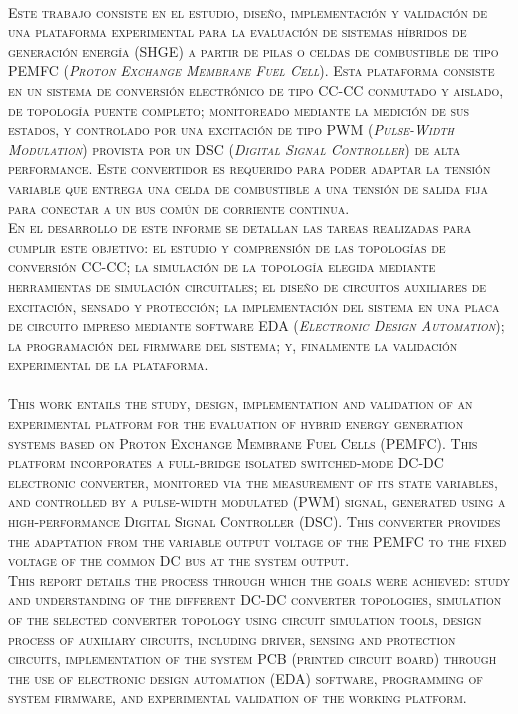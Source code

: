 \huge
\scshape\color{AzulFI_dark}
\\

\normalfont\normalsize\normalcolor
Este trabajo consiste en el estudio, diseño, implementación y validación de una plataforma experimental para la evaluación de sistemas híbridos de generación energía (SHGE) a partir de pilas o celdas de combustible de tipo PEMFC (\textit{Proton Exchange Membrane Fuel Cell}). Esta plataforma consiste en un sistema de conversión electrónico de tipo CC-CC conmutado y aislado, de topología puente completo; monitoreado mediante la medición de sus estados, y controlado por una excitación de tipo PWM (\textit{Pulse-Width Modulation}) provista por un DSC (\textit{Digital Signal Controller}) de alta performance. Este convertidor es requerido para poder adaptar la tensión variable que entrega una celda de combustible a una tensión de salida fija para conectar a un bus común de corriente continua.\\

En el desarrollo de este informe se detallan las tareas realizadas para cumplir este objetivo: el estudio y comprensión de las topologías de conversión CC-CC; la simulación de la topología elegida mediante herramientas de simulación circuitales; el diseño de circuitos auxiliares de excitación, sensado y protección; la implementación del sistema en una placa de circuito impreso mediante software EDA (\textit{Electronic Design Automation}); la programación del firmware del sistema; y, finalmente la validación experimental de la plataforma.\\

\vspace{1cm}
\huge
\scshape\color{AzulFI_dark}
\\

\normalsize\normalfont\normalcolor
This work entails the study, design, implementation and validation of an experimental platform for the evaluation of hybrid energy generation systems based on Proton Exchange Membrane Fuel Cells (PEMFC). This platform incorporates a full-bridge isolated switched-mode DC-DC electronic converter, monitored via the measurement of its state variables, and controlled by a pulse-width modulated (PWM) signal, generated using a high-performance Digital Signal Controller (DSC). This converter provides the adaptation from the variable output voltage of the PEMFC to the fixed voltage of the common DC bus at the system output.\\

This report details the process through which the goals were achieved: study and understanding of the different DC-DC converter topologies, simulation of the selected converter topology using circuit simulation tools, design process of auxiliary circuits, including driver, sensing and protection circuits,  implementation of the system PCB (printed circuit board) through the use of electronic design automation (EDA) software, programming of system firmware, and experimental validation of the working platform.\\ 